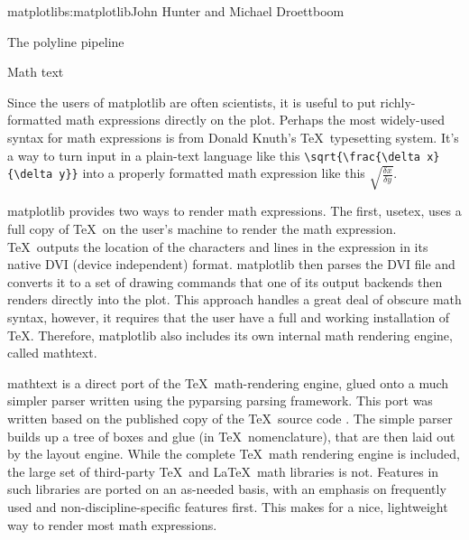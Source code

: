 \begin{aosachapter}{matplotlib}{s:matplotlib}{John Hunter and Michael Droettboom}
\begin{aosasect1}{The polyline pipeline}
\begin{aosaenumerate}
\end{aosaenumerate}



\end{aosasect1}

\begin{aosasect1}{Math text}

Since the users of matplotlib are often scientists, it is useful to
put richly-formatted math expressions directly on the plot.  Perhaps
the most widely-used syntax for math expressions is from Donald
Knuth's \TeX\ typesetting system.  It's a way to turn input in a
plain-text language like this \verb+\sqrt{\frac{\delta x}{\delta y}}+
into a properly formatted math expression like this
$\sqrt{\frac{\delta x}{\delta y}}$.

matplotlib provides two ways to render math expressions.  The first,
usetex, uses a full copy of \TeX\ on the user's machine to render the
math expression.  \TeX\ outputs the location of the characters and
lines in the expression in its native DVI (device independent) format.
matplotlib then parses the DVI file and converts it to a set of
drawing commands that one of its output backends then renders directly
into the plot.  This approach handles a great deal of obscure math
syntax, however, it requires that the user have a full and working
installation of \TeX.  Therefore, matplotlib also includes its own
internal math rendering engine, called mathtext.

mathtext is a direct port of the \TeX\ math-rendering engine, glued
onto a much simpler parser written using the pyparsing
\cite{bib:pyparsing} parsing framework.  This port was written based
on the published copy of the \TeX\ source code \cite{bib:texprogram}.
The simple parser builds up a tree of boxes and glue (in \TeX\
nomenclature), that are then laid out by the layout engine.  While the
complete \TeX\ math rendering engine is included, the large set of
third-party \TeX\ and \LaTeX\ math libraries is not.  Features in such
libraries are ported on an as-needed basis, with an emphasis on
frequently used and non-discipline-specific features first.  This
makes for a nice, lightweight way to render most math expressions.


\end{aosasect1}
\end{aosachapter}
